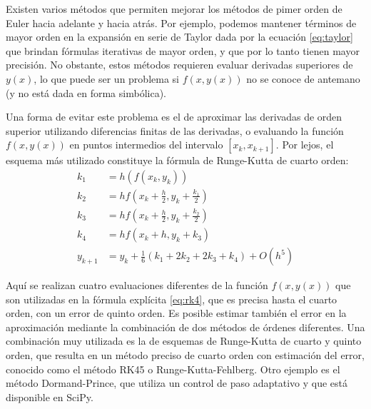 Existen varios métodos que permiten mejorar los métodos de pimer orden de Euler hacia adelante y hacia atrás. Por ejemplo, podemos mantener términos de mayor orden en la expansión en serie de Taylor dada por la ecuación \ref{eq:taylor} que brindan fórmulas iterativas de mayor orden, y que por lo tanto tienen mayor precisión. No obstante, estos métodos requieren evaluar derivadas superiores de $y(x)$, lo que puede ser un problema si $f(x, y(x))$ no se conoce de antemano (y no está dada en forma simbólica). 
 
Una forma de evitar este problema es el de aproximar las derivadas de orden superior utilizando diferencias finitas de las derivadas, o evaluando la función $f(x, y(x))$ en puntos intermedios del intervalo $[x_k, x_{k+1}]$. Por lejos, el esquema más utilizado constituye la fórmula de Runge-Kutta de cuarto orden:
 \begin{align}
  k_1 &= h \left( f(x_k, y_k) \right) \nonumber \\
  k_2 &= h f\left( x_k + \frac{h}{2} , y_k + \frac{k_1}{2} \right) \nonumber  \\
  k_3 &= h f\left( x_k + \frac{h}{2} , y_k + \frac{k_2}{2} \right) \nonumber  \\
  k_4 &= h f\left( x_k + h , y_k + k_3 \right) \nonumber  \\
  y_{k+1} &= y_k + \frac{1}{6} \left( k_1 + 2k_2 + 2k_3 + k_4 \right) + O(h^5)  \label{eq:rk4}
 \end{align}

Aquí se realizan cuatro evaluaciones diferentes de la función $f(x, y(x))$ que son utilizadas en la fórmula explícita \ref{eq:rk4}, que es precisa hasta el cuarto orden, con un error de quinto orden. Es posible estimar también el error en la aproximación mediante la combinación de dos métodos de órdenes diferentes. Una combinación muy utilizada es la de esquemas de Runge-Kutta de cuarto y quinto orden, que resulta en un método preciso de cuarto orden con estimación del error, conocido como el método RK45 o Runge-Kutta-Fehlberg. Otro ejemplo es el método Dormand-Prince, que utiliza un control de paso adaptativo y que está disponible en SciPy.

